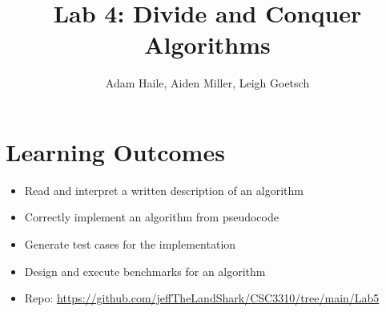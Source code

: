 \documentclass{labReport}
\title{Lab 4: Divide and Conquer Algorithms}
\author{Adam Haile, Aiden Miller, Leigh Goetsch}
\begin{document}
\maketitle

\section*{Learning Outcomes}
\begin{itemize}
    \item Read and interpret a written description of an algorithm
    \item Correctly implement an algorithm from pseudocode
    \item Generate test cases for the implementation
    \item Design and execute benchmarks for an algorithm
    \item Repo: \url{https://github.com/jeffTheLandShark/CSC3310/tree/main/Lab5}
\end{itemize}


\newpage
\end{document}
